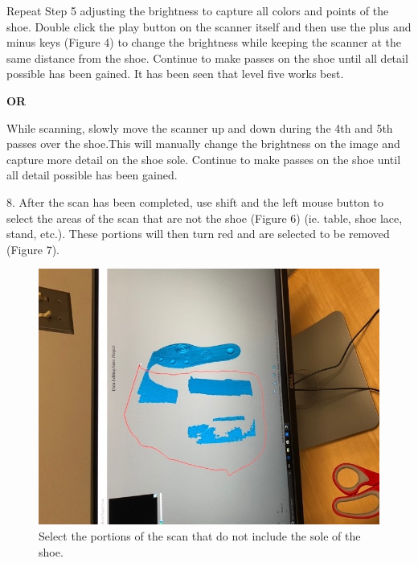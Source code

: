 \begin{description}
 \item Repeat Step 5 adjusting the brightness to capture all colors and points of the shoe. Double click the play button on the scanner itself and then use the plus and minus keys (Figure 4) to change the brightness while keeping the scanner at the same distance from the shoe. Continue to make passes on the shoe until all detail possible has been gained. It has been seen that level five works best.

\textbf{OR}

 \item While scanning, slowly move the scanner up and down during the 4th and 5th passes over the shoe.This will manually change the brightness on the image and capture more detail on the shoe sole. Continue to make passes on the shoe until all detail possible has been gained.
\end{description}

8. After the scan has been completed, use shift and the left mouse button to select the areas of the scan that are not the shoe (Figure 6) (ie. table, shoe lace, stand, etc.). These portions will then turn red and are selected to be removed (Figure 7).

\begin{figure}[!htp]
\centering
\includegraphics[scale=.75, angle=270]{3D_Crop}
\caption{Select the portions of the scan that do not include the sole of the shoe.}
\label{Image 6}
\end{figure}

